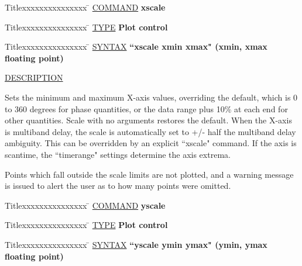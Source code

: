 \begin{tabbing}
Titlexxxxxxxxxxxxxxx \= \kill
\underline{COMMAND} \> {\bf 	xscale} \\
\end{tabbing}

\begin{tabbing}
Titlexxxxxxxxxxxxxxx \= \kill
\underline{TYPE} \> {\bf 		Plot control} \\
\end{tabbing}

\begin{tabbing}
Titlexxxxxxxxxxxxxxx \= \kill
\underline{SYNTAX} \> {\bf 		``xscale xmin xmax" (xmin, xmax floating point)} \\
\end{tabbing}

\underline{DESCRIPTION}
\begin{list}{}{\setlength{\leftmargin}{0.5in}
     \setlength{\rightmargin}{0in}}
\item
Sets the minimum and maximum X-axis values, overriding the
default, which is 0 to 360 degrees for phase quantities, or
the data range plus 10\% at each end for other quantities.
Scale with no arguments restores the default.  When
the X-axis is multiband delay, the scale is automatically set
to +/- half the multiband delay ambiguity.
This can be overridden by an explicit ``xscale" command.
If the axis is scantime, the ``timerange" settings determine
the axis extrema.
\item
Points which fall outside the scale limits are not plotted, and
a warning message is issued to alert the user as to how many
points were omitted.
\end{list}
\vspace{.2in}

\begin{tabbing}
Titlexxxxxxxxxxxxxxx \= \kill
\underline{COMMAND} \> {\bf 	yscale} \\
\end{tabbing}

\begin{tabbing}
Titlexxxxxxxxxxxxxxx \= \kill
\underline{TYPE} \> {\bf 		Plot control} \\
\end{tabbing}

\begin{tabbing}
Titlexxxxxxxxxxxxxxx \= \kill
\underline{SYNTAX} \> {\bf 		``yscale ymin ymax" (ymin, ymax floating point)} \\
\end{tabbing}

